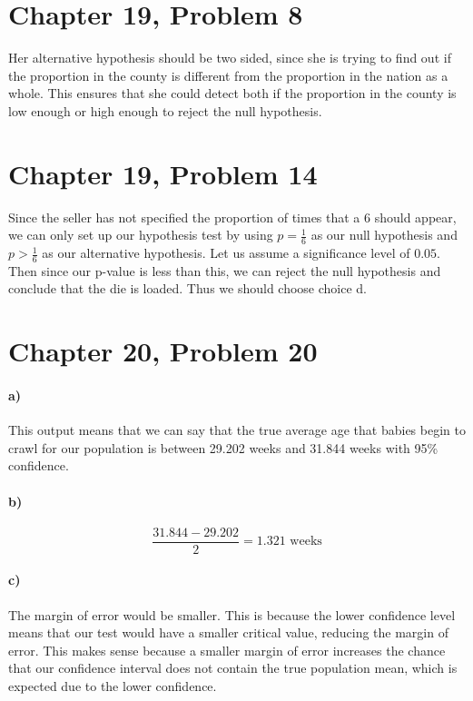 \documentclass[12pt]{article}
\begin{document}
\section*{Chapter 19, Problem 8}

Her alternative hypothesis should be two sided, since she is trying to find out if the proportion in the county is
different from the proportion in the nation as a whole. This ensures that she could detect both if the proportion in the
county is low enough or high enough to reject the null hypothesis.

\section*{Chapter 19, Problem 14}

Since the seller has not specified the proportion of times that a 6 should appear, we can only set up our hypothesis
test by using \(p=\frac{1}{6}\) as our null hypothesis and \(p>\frac{1}{6}\) as our alternative hypothesis. Let
us assume a significance level of \(0.05\). Then since our p-value is less than this, we can reject the null hypothesis
and conclude that the die is loaded. Thus we should choose choice d. 

\section*{Chapter 20, Problem 20}

\paragraph{a)}

This output means that we can say that the true average age that babies begin to crawl for our population is
between 29.202 weeks and 31.844 weeks with 95\% confidence.

\paragraph{b)}

\[\frac{31.844-29.202}{2}=1.321 \text{ weeks}\]

\paragraph{c)}

The margin of error would be smaller. This is because the lower confidence level means that our test would have a smaller
critical value, reducing the margin of error. This makes sense because a smaller margin of error increases the chance
that our confidence interval does not contain the true population mean, which is expected due to the lower confidence.
\end{document}
